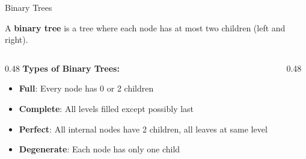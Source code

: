\documentclass[aspectratio=169,xcolor=dvipsnames]{beamer}
\begin{document}
\begin{frame}{Binary Trees}
  \begin{definition}
    A \textbf{binary tree} is a tree where each node has at most two children (left and right).
  \end{definition}

  \vspace{0.3cm}

  \begin{columns}
    \begin{column}{0.48\textwidth}
      \textbf{Types of Binary Trees:}
      \begin{itemize}
        \item \textbf{Full}: Every node has 0 or 2 children
        \item \textbf{Complete}: All levels filled except possibly last
        \item \textbf{Perfect}: All internal nodes have 2 children, all leaves at same level
        \item \textbf{Degenerate}: Each node has only one child
      \end{itemize}
    \end{column}
    \begin{column}{0.48\textwidth}
    \end{column}
  \end{columns}
\end{frame}
\end{document}
